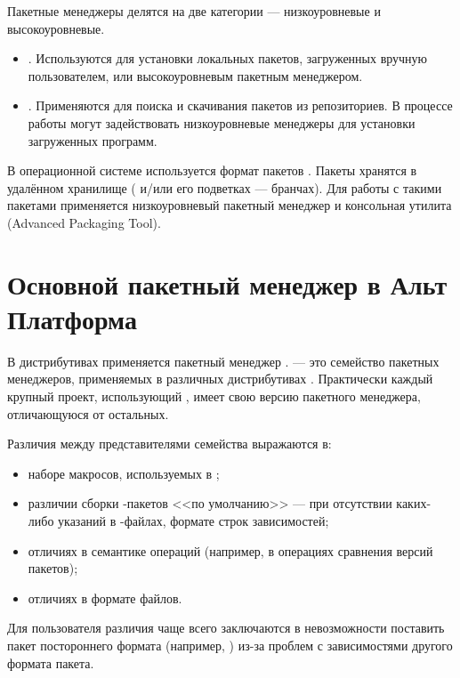 Пакетные менеджеры делятся на две категории --- низкоуровневые и высокоуровневые.

\begin{itemize}
	\item {}. Используются для установки 
		локальных пакетов, загруженных вручную пользователем, или высокоуровневым пакетным менеджером.
	\item {}. Применяются для поиска и скачивания пакетов из репозиториев. 
		В процессе работы могут задействовать низкоуровневые менеджеры для установки загруженных программ.
\end{itemize}

В операционной системе  используется формат пакетов . 
Пакеты  хранятся в удалённом хранилище ( и/или его подветках --- бранчах). 
Для работы с такими пакетами применяется низкоуровневый пакетный менеджер  
и консольная утилита  (Advanced Packaging Tool). 

\section{Основной пакетный менеджер в Альт Платформа}
В дистрибутивах  применяется пакетный менеджер .  --- 
это семейство пакетных менеджеров, применяемых в различных дистрибутивах . 
Практически каждый крупный проект, использующий , имеет свою версию пакетного менеджера, 
отличающуюся от остальных.

Различия между представителями семейства  выражаются в:

\begin{itemize}
	\item наборе макросов, используемых в ;
	\item различии сборки -пакетов <<по умолчанию>> --- при отсутствии каких-либо 
		указаний в -файлах, формате строк зависимостей;
	\item отличиях в семантике операций (например, в операциях сравнения версий пакетов);
	\item отличиях в формате файлов.
\end{itemize}

Для пользователя различия чаще всего заключаются в невозможности поставить пакет постороннего 
формата (например, ) из-за проблем с зависимостями другого формата пакета. 

